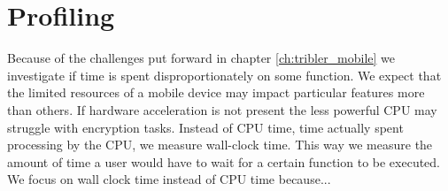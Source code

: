 \section{Profiling}
Because of the challenges put forward in chapter \ref{ch:tribler_mobile} we investigate if time is spent disproportionately on some function.
We expect that the limited resources of a mobile device may impact particular features more than others.
If hardware acceleration is not present the less powerful CPU may struggle with encryption tasks.
Instead of CPU time, time actually spent processing by the CPU, we measure wall-clock time.
This way we measure the amount of time a user would have to wait for a certain function to be executed.
We focus on wall clock time instead of CPU time because...

